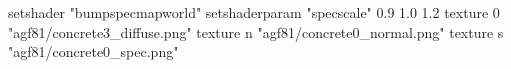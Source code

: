 setshader "bumpspecmapworld"
setshaderparam "specscale" 0.9 1.0 1.2
    texture 0 "agf81/concrete3_diffuse.png"
    texture n "agf81/concrete0_normal.png"
    texture s "agf81/concrete0_spec.png"